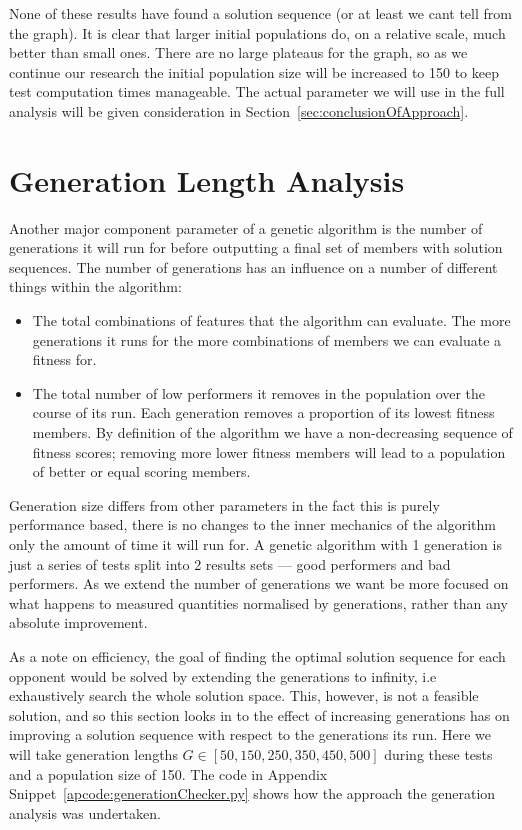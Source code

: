 None of these results have found a solution sequence (or at least we cant tell from the graph).
It is clear that larger initial populations do, on a relative scale, much better than small ones.
There are no large plateaus for the graph, so as we continue our research the initial population size will be increased to 150 to keep test computation times manageable.
The actual parameter we will use in the full analysis will be given consideration in Section~\ref{sec:conclusionOfApproach}.

\section{Generation Length Analysis}\label{sec:generationlengthanalysis}
Another major component parameter of a genetic algorithm is the number of generations it will run for before outputting a final set of members with solution sequences.
The number of generations has an influence on a number of different things within the algorithm:
\begin{itemize}
    \item {The total combinations of features that the algorithm can evaluate. 
    The more generations it runs for the more combinations of members we can evaluate a fitness for.}
    \item {The total number of low performers it removes in the population over the course of its run. 
    Each generation removes a proportion of its lowest fitness members.
    By definition of the algorithm we have a non-decreasing sequence of fitness scores; removing more lower fitness members will lead to a population of better or equal scoring members. }
\end{itemize}
Generation size differs from other parameters in the fact this is purely performance based, there is no changes to the inner mechanics of the algorithm only the amount of time it will run for.
A genetic algorithm with 1 generation is just a series of tests split into 2 results sets --- good performers and bad performers.
As we extend the number of generations we want be more focused on what happens to measured quantities normalised by generations, rather than any absolute improvement.

As a note on efficiency, the goal of finding the optimal solution sequence for each opponent would be solved by extending the generations to infinity, i.e exhaustively search the whole solution space.
This, however, is not a feasible solution, and so this section looks in to the effect of increasing generations has on improving a solution sequence with respect to the generations its run.
Here we will take generation lengths \(G \in [50,150,250,350,450,500]\) during these tests and a population size of 150.
The code in Appendix Snippet~\ref{apcode:generationChecker.py} shows how the approach the generation analysis was undertaken.

